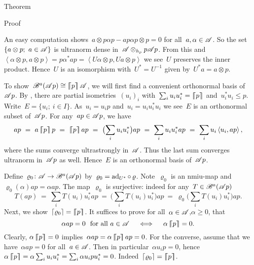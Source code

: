 \begin{parsec}
\begin{point}{Theorem}
\begin{point}{Proof}
\begin{point}
An easy computation shows~$a \otimes p\alpha p - ap\alpha p \otimes p = 0$
    for all~$a, \alpha \in \mathscr{A}$.
So the set~$\{a \otimes p;\ a\in \mathscr{A}\}$
    is ultranorm dense in~$\mathscr{A} \otimes_{h_p} p \mathscr{A} p$.
From this and
    $\left<\alpha \otimes p, a\otimes p\right> = 
        p \alpha^* a p
        =\left< U \alpha \otimes p, U a \otimes p\right> $
        we see~$U$ preserves the inner product.
Hence~$U$ is an isomorphism with~$U^* = U^{-1}$
    given by~$U^* a = a\otimes p$.
\end{point}
\begin{point}%
To show~$\mathscr{B}^a(\mathscr{A} p) \cong \left\lceil\!\!\left\lceil p\right\rceil\!\!\right\rceil\mathscr{A}$,
we will first find a convenient orthonormal basis of~$\mathscr{A} p$.
By ,
    there are partial isometries~$(u_i)_i$
    with~$\sum_i u_iu_i^* = \left\lceil\!\!\left\lceil p\right\rceil\!\!\right\rceil$
    and~$u_i^*u_i \leq p$.
Write~$E = \{u_i; \ i \in I\}$.
As~$u_i = u_i p$ and~$u_i= u_i u_i^* u_i$
    we see~$E$ is an orthonormal subset of~$\mathscr{A} p$.
For any~$ap \in \mathscr{A} p$, we have
\begin{equation*}
    ap \ =\  a \cceil{p} p
       \ =\  \cceil{p} a p
       \ = \ \bigl(\sum_i u_i u_i^*\bigr) ap
       \ = \ \sum_i u_i u_i^* ap
       \ = \ \sum_i u_i \left<u_i,ap\right>,
\end{equation*}
where the sums converge ultrastrongly in~$\mathscr{A}$.
Thus the last sum converges ultranorm in~$\mathscr{A} p$ as well.
Hence~$E$ is an orthonormal basis of~$\mathscr{A} p$.

Define~$\varrho_0 \colon \mathscr{A} \to \mathscr{B}^a(\mathscr{A} p)$
    by~$\varrho_0 = \mathrm{ad}_{U^*} \mathop{\circ} \varrho$.
Note~$\varrho_0$ is an nmiu-map and~$\varrho_0(\alpha)ap = \alpha ap$.
The map~$\varrho_0$ is surjective:
    indeed for any~$T \in \mathscr{B}^a(\mathscr{A} p)$
\begin{equation*}
    T (ap) \ = \ \sum_i T( u_i ) u_i^* ap
           \ = \ \bigl(\sum_i T( u_i ) u_i^*\bigr) ap
           \ = \ \varrho_0 \bigl(\sum_i T( u_i ) u_i^*\bigr) ap.
\end{equation*}
Next, we show~$\left\lceil\varrho_0\right\rceil = \left\lceil\!\!\left\lceil p\right\rceil\!\!\right\rceil$.
It suffices to prove for all~$\alpha \in \mathscr{A}$,$\alpha \geq 0$, that
\begin{equation*}
    \alpha ap = 0 \text{ \ for all\  } a\in \mathscr{A}
    \quad\iff \quad
    \alpha \left\lceil\!\!\left\lceil p\right\rceil\!\!\right\rceil = 0.
\end{equation*}
    Clearly,
    $\alpha \left\lceil\!\!\left\lceil p\right\rceil\!\!\right\rceil = 0$ implies~$\alpha ap = \alpha \left\lceil\!\!\left\lceil p\right\rceil\!\!\right\rceil ap= 0$.
For the converse, assume that we have~$\alpha ap = 0$ for all~$a\in\mathscr{A}$.
Then in particular~$\alpha u_ip = 0$,
    hence~$\alpha \left\lceil\!\!\left\lceil p\right\rceil\!\!\right\rceil = \alpha \sum_i u_iu_i^*  = \sum_i \alpha u_ipu_i^*=0$.
    Indeed~$\left\lceil\varrho_0\right\rceil = \left\lceil\!\!\left\lceil p\right\rceil\!\!\right\rceil$.


\end{point}
\end{point}
\end{point}
\end{parsec}
